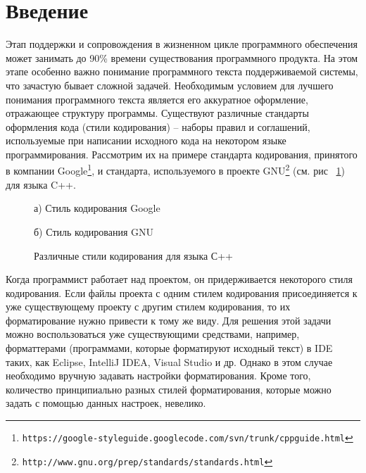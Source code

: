 \section*{Введение}

Этап поддержки и сопровождения в жизненном цикле программного обеспечения может занимать до 90\% времени существования программного продукта. На этом этапе особенно важно понимание программного текста поддерживаемой системы, что зачастую бывает сложной задачей. Необходимым условием для лучшего понимания программного текста является его аккуратное оформление, отражающее структуру%
программы. Существуют различные стандарты оформления кода (стили кодирования) -- наборы правил и соглашений, используемые при написании исходного кода на некотором языке программирования.
Рассмотрим их на примере стандарта кодирования, принятого в компании Google\footnote{\texttt{https://google-styleguide.googlecode.com/svn/trunk/cppguide.html}}, и стандарта, используемого в проекте GNU\footnote{\texttt{http://www.gnu.org/prep/standards/standards.html}} (см. рис ~\ref{codingstandards}) для языка C++.


\begin{figure}[ht]
\noindent\begin{minipage}{.5\textwidth}
    
\caption*{а) Стиль кодирования Google}    
\end{minipage}\hfill
\begin{minipage}{.5\textwidth}
    
\caption*{б) Стиль кодирования GNU}    
\end{minipage}
\caption{Различные стили кодирования для языка С++}    
\label{codingstandards}
\end{figure}

Когда программист работает над проектом, он придерживается некоторого стиля кодирования. 
Если файлы проекта с одним стилем кодирования присоединяется к уже существующему проекту с другим стилем кодирования, то их форматирование нужно привести к тому же виду. 
Для решения этой задачи можно воспользоваться уже существующими средствами, например, форматтерами (программами, которые форматируют исходный текст) в IDE таких, как Eclipse, IntelliJ IDEA, Visual Studio и др. 
Однако в этом случае необходимо вручную задавать настройки форматирования.
Кроме того, количество принципиально разных стилей форматирования, которые можно задать с помощью данных настроек, невелико.


